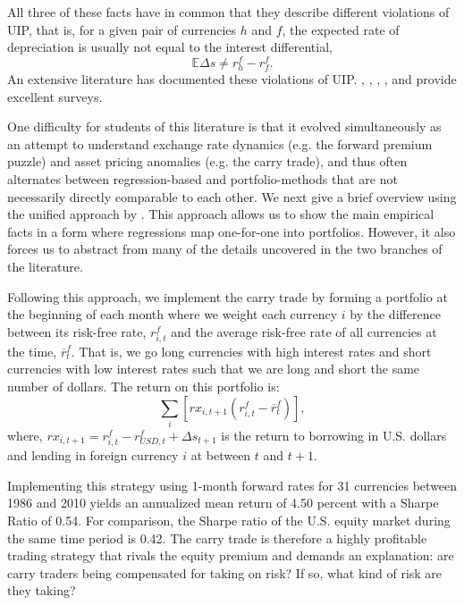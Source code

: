 \documentclass{ar-1col}
\begin{document}
All three of these facts have in common that they describe different violations of UIP, that is, for a given pair of currencies $h$ and $f$, the expected rate of depreciation is usually not equal to the interest differential, $$\mathbb{E}\Delta s \neq r^f_h-r^f_f .$$ An extensive literature has documented these violations of UIP. \citet{Hodrick1987}, \citet{FrootThaler1990}, \citet{Engel1996}, \citet{Lewis2011}, and \citet{Engel2014} provide excellent surveys.

One difficulty for students of this literature is that it evolved simultaneously as an attempt to understand exchange rate dynamics (e.g. the forward premium puzzle) and asset pricing anomalies (e.g. the carry trade), and thus often alternates between regression-based and portfolio-methods that are not necessarily directly comparable to each other. We next give a brief overview using the unified approach by \citet{HassanMano2019}. This approach allows us to show the main empirical facts in a form where regressions map one-for-one into portfolios. However, it also forces us to abstract from many of the details uncovered in the two branches of the literature.

Following this approach, we implement the carry trade by forming a portfolio at the beginning of each month where we weight each currency $i$ by the difference between its risk-free rate, $r^f_{i, t}$ and the average risk-free rate of all currencies at the time, $\overline{r}^f_t$. That is, we go long currencies with high interest rates and short currencies with low interest rates such that we are long and short the same number of dollars. The return on this portfolio is:
\begin{equation}
  \label{eq_carry}
  \textstyle\sum_{i}\left[ rx_{i, t+1}\left( r^f_{i, t}-\overline{r}^f_{t}\right) \right] ,
\end{equation}%
where, $rx_{i, t+1} = r^f_{i, t} - r^f_{USD, t} + \Delta s_{t + 1}$ is the return to borrowing in U.S. dollars and lending in foreign currency $i$ at between $t$ and $t+1$.

Implementing this strategy using 1-month forward rates for 31 currencies between 1986 and 2010 yields an annualized mean return of 4.50 percent with a Sharpe Ratio of 0.54. For comparison, the Sharpe ratio of the U.S. equity market during the same time period is 0.42. The carry trade is therefore a highly profitable trading strategy that rivals the equity premium and demands an explanation: are carry traders being compensated for taking on risk? If so, what kind of risk are they taking?
\end{document}
